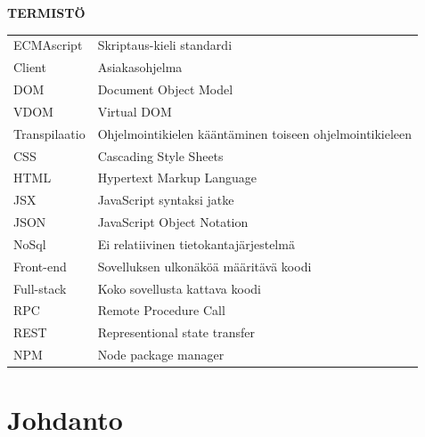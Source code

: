 \documentclass[11pt,a4paper,titlepage,oneside]{article}
\begin{document}
\textbf{ TERMISTÖ }\\
\bigskip

\begin{tabular}{ p{3.7cm} b{12cm} }
ECMAscript\bigskip & Skriptaus-kieli standardi \\ 
Client\bigskip & Asiakasohjelma\\
DOM\bigskip & Document Object Model\\
VDOM\bigskip & Virtual DOM\\
Transpilaatio\bigskip & Ohjelmointikielen kääntäminen toiseen ohjelmointikieleen\\
CSS\bigskip & Cascading Style Sheets\\
HTML\bigskip & Hypertext Markup Language\\
JSX\bigskip & JavaScript syntaksi jatke\\
JSON\bigskip & JavaScript Object Notation\\
NoSql\bigskip & Ei relatiivinen tietokantajärjestelmä\\
Front-end\bigskip & Sovelluksen ulkonäköä määritävä koodi\\
Full-stack\bigskip & Koko sovellusta kattava koodi\\
RPC\bigskip & Remote Procedure Call\\
REST\bigskip & Representional state transfer\\
NPM\bigskip & Node package manager\\
\end{tabular}




\newpage

\clearpage
\setcounter{page}{1}

\pagestyle{fancy}
\lfoot{}
\cfoot{}
\rfoot{}
\lhead{}
\chead{}
\rhead{\thepage}
\renewcommand{\headrulewidth}{0pt}
\renewcommand{\footrulewidth}{0pt}







    






\section{Johdanto}              %
\end{document}
